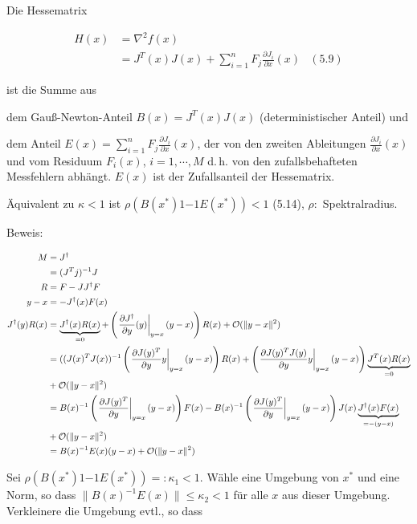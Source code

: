 Die Hessematrix

\begin{align*}
H(x) &= \nabla^2 f(x) \\
&= J^T(x) J(x) + \sum\limits_{i=1}^n F_j \frac{\partial J_i}{\partial x} (x) & (5.9)
\end{align*}

ist die Summe aus

\bitm
\item dem Gauß-Newton-Anteil $B(x) = J^T(x) J(x)$ (deterministischer Anteil) und
\item dem Anteil $E(x) = \sum_{i=1}^n F_j \frac{\partial J_i}{\partial x} (x)$, der von den zweiten Ableitungen $\frac{\partial J_i}{\partial x} (x)$ und vom Residuum $F_i(x)$, $i=1,\cdots,M$ d.\,h. von den zufallsbehafteten Messfehlern abhängt. $E(x)$ ist der Zufallsanteil der Hessematrix.
\eitm


Äquivalent zu $\kappa < 1$ ist $\rho (B(x^*)1{-1} E(x^*)) < 1$ (5.14), $\rho: $ Spektralradius.

Beweis:

\begin{align*}
M &= J^\dagger \\
&= (J^T j)^{-1} J \\
R &= F - J J^\dagger F \\
y-x &= - J^\dagger(x) F(x) \\
J^\dagger(y) R(x) &= \underbrace{J^\dagger(x) R(x)}_{=0} + \left( \left. \frac{\partial J^\dagger}{\partial y} (y)\right|_{y=x} (y-x) \right) R(x) + \mathcal O(\|y-x\|^2) \\
&= ((J(x)^T J(x))^{-1} \left( \left. \frac{\partial J(y)^T}{\partial y} y\right|_{y=x} (y-x) \right) R(x) + \left( \left. \frac{\partial J(y)^T J(y)}{\partial y} y\right|_{y=x} (y-x) \right) \underbrace{J^T(x) R(x)}_{=0} \\ &+ \mathcal O(\|y-x\|^2) \\
&= B(x)^{-1} \left( \left. \frac{\partial J(y)^T}{\partial y} \right|_{y=x} (y-x) \right) F(x) - B(x)^{-1} \left( \left. \frac{\partial J(y)^T}{\partial y} \right|_{y=x} (y-x) \right)J(x) \underbrace{J^\dagger(x) F(x)}_{=-(y-x)} \\ &+ \mathcal O(\|y-x\|^2) \\
&= B(x)^{-1} E(x) (y-x) + \mathcal O(\|y-x\|^2) \\
\end{align*}

Sei $\rho(B(x^*)1{-1} E(x^*)) =: \kappa_1 < 1$. Wähle eine Umgebung von $x^*$ und eine Norm, so dass $\| B(x)^{-1} E(x) \| \leq \kappa_2 < 1$ für alle $x$ aus dieser Umgebung. Verkleinere die Umgebung evtl., so dass 

